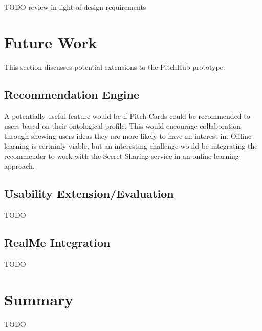 TODO review in light of design requirements

\section{Future Work}

This section discusses potential extensions to the PitchHub prototype.

\subsection{Recommendation Engine}

A potentially useful feature would be if Pitch Cards could be recommended to users based on their ontological profile. This would encourage collaboration through showing users ideas they are more likely to have an interest in. Offline learning is certainly viable, but an interesting challenge would be integrating the recommender to work with the Secret Sharing service in an online learning approach.

\subsection{Usability Extension/Evaluation}

TODO

\subsection{RealMe Integration}

TODO

\section{Summary}

TODO